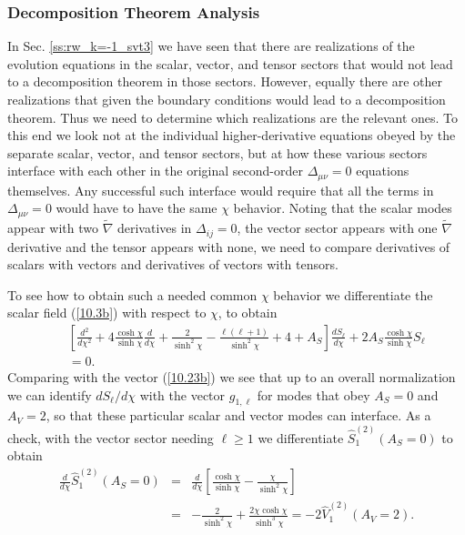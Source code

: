 \subsubsection{Decomposition Theorem Analysis}
\label{ss:recovering_decomposition_theorem}
In Sec. \ref{ss:rw_k=-1_svt3} we have seen that there are realizations of the evolution equations in the scalar, vector, and tensor sectors that would not lead to a decomposition theorem in those sectors. However, equally there are other realizations that given the boundary conditions would lead to a decomposition theorem. Thus we need to determine which realizations are the relevant ones. To this end we look not at the individual higher-derivative equations obeyed by the separate scalar, vector, and tensor sectors, but at how these various sectors interface with each other in the original second-order $\Delta_{\mu\nu}=0$ equations themselves. Any successful such interface would require that all the terms in $\Delta_{\mu\nu}=0$ would have to have the same $\chi$ behavior. Noting that the scalar modes appear with two $\tilde{\nabla}$ derivatives in $\Delta_{ij}=0$, the vector sector appears with one $\tilde{\nabla}$ derivative and the tensor appears with none, we need to compare derivatives of scalars with vectors and derivatives of vectors with tensors. 

To see how to obtain such a needed common $\chi$ behavior we differentiate the scalar field (\ref{10.3b}) with respect to $\chi$, to obtain
%  
\begin{eqnarray}
&&\left[\frac{d^2}{d\chi^2}+4\frac{\cosh\chi}{\sinh\chi}\frac{d }{ d\chi}
+\frac{2}{\sinh^2\chi}-\frac{\ell(\ell+1)}{\sinh^2\chi}+4+A_S\right]\frac{d S_{\ell}}{d \chi}
+2A_S\frac{\cosh\chi}{\sinh\chi}S_{\ell}
\nonumber\\
&&=0.
\label{11.1}
\end{eqnarray}
%
Comparing with the vector (\ref{10.23b}) we see that up to an overall normalization we can identify $d S_{\ell}/d\chi$ with the vector $g_{1,\ell}$ for modes that obey $A_S=0$ and $A_V=2$, so that these particular scalar and vector modes can interface. As a check, with the vector sector needing $\ell \geq 1$ we differentiate $\hat{S}^{(2)}_1(A_S=0)$ to obtain
%  
\begin{eqnarray}
\frac{d}{d \chi}\hat{S}^{(2)}_1(A_S=0) &=&\frac{d}{d \chi}\left[\frac{\cosh\chi}{\sinh\chi}-\frac{\chi}{\sinh^2\chi}\right]
\nonumber\\
&=&-\frac{2}{ \sinh^2\chi}+\frac{2\chi\cosh\chi}{ \sinh^3\chi}=-2\hat{V}^{(2)}_1(A_V=2).
\label{11.2}
\end{eqnarray}
%

